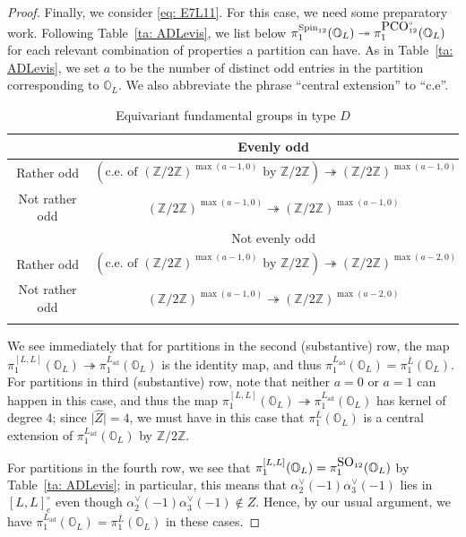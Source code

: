 \documentclass[11pt]{amsart}
\renewcommand{\O}{{\mathbb O}}
\newcommand{\bZ}{{\mathbb Z}}
\newcommand{\ad}{{\operatorname{ad}}}
\newcommand{\Spin}{{\operatorname{Spin}}}
\newcommand{\PCO}{{{\mbox{\rm PCO}}}}
\newcommand{\SO}{{{\mbox{\rm SO}}}}
\numberwithin{equation}{section}
\begin{document}
\begin{proof}
		Finally, we consider \eqref{eq: E7L11}. For this case, we need some preparatory work. Following Table~\ref{ta: ADLevis}, we list below $\pi_1^{\Spin_{12}}(\O_L)\twoheadrightarrow \pi_1^{\tiny \PCO_{12}^\circ}(\O_L)$ for each relevant combination of properties a partition can have. As in Table~\ref{ta: ADLevis}, we set $a$ to be the number of distinct odd entries in the partition corresponding to $\O_L$. We also abbreviate the phrase ``central extension'' to ``c.e''.
		\renewcommand{\arraystretch}{2}
		\begin{center}
			\begin{longtable}{|c|c|}
				\hline
				& Evenly odd \\
				\hline
				Rather odd & $(\mbox{c.e. of }(\bZ/2\bZ)^{\max(a-1,0)}\mbox{ by }\bZ/2\bZ )\twoheadrightarrow (\bZ/2\bZ)^{\max(a-1,0)}$ \\
				\hline
				Not rather odd & $(\bZ/2\bZ)^{\max(a-1,0)}\twoheadrightarrow (\bZ/2\bZ)^{\max(a-1,0)}$  \\
				\hline
				& Not evenly odd \\
				\hline
				Rather odd &  $(\mbox{c.e. of }(\bZ/2\bZ)^{\max(a-1,0)}\mbox{ by }\bZ/2\bZ)\twoheadrightarrow (\bZ/2\bZ)^{\max(a-2,0)}$  \\
				\hline
				Not rather odd & $(\bZ/2\bZ)^{\max(a-1,0)}\twoheadrightarrow (\bZ/2\bZ)^{\max(a-2,0)}$ \\
				\hline
				\caption{Equivariant fundamental groups in type $D$}\label{ta: ADfunds}
			\end{longtable}
		\end{center}
		\renewcommand{\arraystretch}{}
		
		We see immediately that for partitions in the second (substantive) row, the map $\pi_1^{[L,L]}(\O_L)\twoheadrightarrow \pi_1^{L_\ad}(\O_L)$ is the identity map, and thus $\pi_1^{L_\ad}(\O_L)=\pi_1^{\overline{L}}(\O_L)$. For partitions in third (substantive) row, note that neither $a=0$ or $a=1$ can happen in this case, and thus the map $\pi_1^{[L,L]}(\O_L)\twoheadrightarrow \pi_1^{L_\ad}(\O_L)$ has kernel of degree 4; since $\vert \widehat{Z}\vert=4$, we must have in this case that $\pi_1^{\overline{L}}(\O_L)$ is a central extension of $\pi_1^{L_\ad}(\O_L)$ by $\bZ/2\bZ$.
		
		For partitions in the fourth row, we see that $\pi_1^{[L,L]}(\O_L)=\pi_1^{\tiny \SO_{12}}(\O_L)$ by Table~\ref{ta: ADLevis}; in particular, this means that $\alpha_2^\vee(-1)\alpha_3^\vee(-1)$ lies in $[L,L]_e^\circ$ even though $\alpha_2^\vee(-1)\alpha_3^\vee(-1)\notin Z$. Hence, by our usual argument, we have $\pi_1^{L_\ad}(\O_L)=\pi_1^{\overline{L}}(\O_L)$ in these cases.
		

\end{proof}
\end{document}
